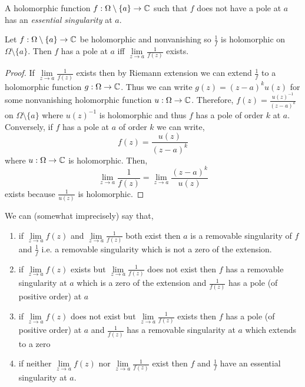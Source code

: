 \documentclass[12pt]{article}
\begin{document}
\begin{rmk}
A holomorphic function $f : \Omega \setminus \{ a \} \to \mathbb{C}$ such that $f$ does not have a pole at $a$ has an \textit{essential singularity} at $a$.
\end{rmk}


\begin{prop}
Let $f : \Omega \setminus \{ a \} \to \mathbb{C}$ be holomorphic and nonvanishing so $\frac{1}{f}$ is holomorphic on $\Omega \setminus \{ a \}$. Then $f$ has a pole at $a$ iff $\lim\limits_{z \to a} \frac{1}{f(z)}$ exists.
\end{prop}

\begin{proof}
If $\lim\limits_{z \to a} \frac{1}{f(z)}$ exists then by Riemann extension we can extend $\frac{1}{f}$ to a holomorphic function $g : \Omega \to \mathbb{C}$. Thus we can write $g(z) = (z - a)^k u(z)$ for some nonvanishing holomorphic function $u : \Omega \to \mathbb{C}$. Therefore, $f(z) = \frac{u(z)^{-1}}{(z - a)^k}$ on $\Omega \setminus \{ a \}$ where $u(z)^{-1}$ is holomorphic and thus $f$ has a pole of order $k$ at $a$. Conversely, if $f$ has a pole at $a$ of order $k$ we can write,
\[ f(z) = \frac{u(z)}{(z - a)^k} \]
where $u : \Omega \to \mathbb{C}$ is holomorphic. Then,
\[ \lim_{z \to a} \frac{1}{f(z)} = \lim_{z \to a} \frac{(z - a)^k}{u(z)} \]
exists because $\frac{1}{u(z)}$ is holomorphic.
\end{proof}


\begin{rmk}
We can (somewhat imprecisely) say that,
\begin{enumerate}
\item if $\lim\limits_{z \to a} f(z)$ and $\lim\limits_{z \to a} \frac{1}{f(z)}$ both exist then $a$ is a removable singularity of $f$ and $\frac{1}{f}$ i.e. a removable singularity which is not a zero of the extension.
\item if $\lim\limits_{z \to a} f(z)$ exists but $\lim\limits_{z \to a} \frac{1}{f(z)}$ does not exist then $f$ has a removable singularity at $a$ which is a zero of the extension and $\frac{1}{f(z)}$ has a pole (of positive order) at $a$
\item if $\lim\limits_{z \to a} f(z)$ does not exist but $\lim\limits_{z \to a} \frac{1}{f(z)}$ exists then $f$ has a pole (of positive order) at $a$ and $\frac{1}{f(z)}$ has a removable singularity at $a$ which extends to a zero
\item if neither $\lim\limits_{z \to a} f(z)$ nor $\lim\limits_{z \to a} \frac{1}{f(z)}$ exist then $f$ and $\frac{1}{f}$ have an essential singularity at $a$.
\end{enumerate}
\end{rmk}
\end{document}
